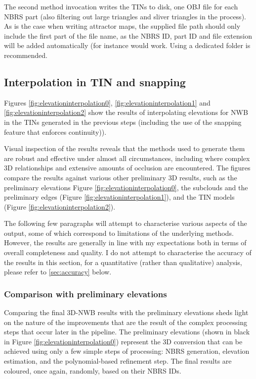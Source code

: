 The second method invocation writes the TINs to disk, one OBJ file for each NBRS part (also filtering out large triangles and sliver triangles in the process). As is the case when writing attractor maps, the supplied file path should only include the first part of  the file name, as the NBRS ID, part ID and file extension will be added automatically (for instance  would work. Using a dedicated folder is recommended.

\subsection{Interpolation in TIN and snapping}
\label{sub:r_interpolation}

Figures \ref{fig:elevationinterpolation0}, \ref{fig:elevationinterpolation1} and \ref{fig:elevationinterpolation2} show the results of interpolating elevations for NWB in the TINs generated in the previous steps (including the use of the snapping feature that enforces continuity)).

Visual inspection of the results reveals that the methods used to generate them are robust and effective under almost all circumstances, including where complex 3D relationships and extensive amounts of occlusion are encountered. The figures compare the results against various other preliminary 3D results, such as the preliminary elevations Figure \ref{fig:elevationinterpolation0}, the subclouds and the preliminary edges (Figure \ref{fig:elevationinterpolation1}), and the TIN models (Figure \ref{fig:elevationinterpolation2}).

The following few paragraphs will attempt to characterise various aspects of the output, some of which correspond to limitations of the underlying methods. However, the results are generally in line with my expectations both in terms of overall completeness and quality. I do not attempt to characterise the accuracy of the results in this section, for a quantitative (rather than qualitative) analysis, please refer to \ref{sec:accuracy} below.

\subsubsection{Comparison with preliminary elevations}

Comparing the final 3D-NWB results with the preliminary elevations sheds light on the nature of the improvements that are the result of the complex processing steps that occur later in the pipeline. The preliminary elevations (shown in black in Figure \ref{fig:elevationinterpolation0}) represent the 3D conversion that can be achieved using only a few simple steps of processing: NBRS generation, elevation estimation, and the polynomial-based refinement step. The final results are coloured, once again, randomly, based on their NBRS IDs.

